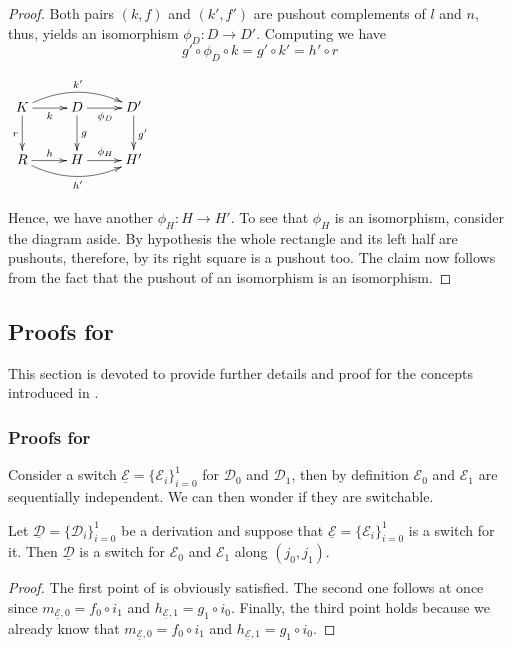 \documentclass[a4paper,UKenglish,cleveref,pdftex,thm-restate,numberwithinsect,anonymous]{lipics}
\newcommand{\dder}[1]{\mathscr{#1}}
\newcommand{\der}[1]{\underline{\dder{#1}}}
\begin{document}
\propUnique*

\label{propUnique-proof}
\begin{proof}
  Both pairs $(k, f)$ and $(k', f')$ are pushout complements of $l$
  and $n$, thus,  yields an isomorphism
  $\phi_D\colon D\to D'$. Computing we have
  \[
    g'\circ \phi_D \circ k= g' \circ k'=h'\circ r
  \]

  \noindent
  \parbox{3cm}{
    $\xymatrix{K \ar@/^.4cm/[rr]^{k'}\ar[d]_{r} \ar[r]_{k}&
      \ar[r]_{\phi_D} D \ar[d]^{g}& D' \ar[d]^{g'}\\ R
      \ar@/_.4cm/[rr]_{h'} \ar[r]^{h}& H \ar[r]^{\phi_H}& H'}$}
  \hfill
  \parbox{10cm}{ \hspace{15pt}Hence, we have another
    $\phi_H\colon H\to H'$. To see that $\phi_H$ is an isomorphism,
    consider the diagram aside. By hypothesis the whole rectangle and
    its left half are pushouts, therefore, by  its right
    square is a pushout too. The claim now follows from the fact that
    the pushout of an isomorphism is an isomorphism. \qedhere }
\end{proof}


\subsection{Proofs for }

This section is devoted to provide further details and proof for the concepts introduced in .

\subsubsection{Proofs for }


Consider a switch $\der{E}=\{\dder{E}_i\}_{i=0}^1$ for $\dder{D}_0$
and $\dder{D}_1$, then by definition $\dder{E}_0$ and $\dder{E}_1$ are
sequentially independent. We can then wonder if they are switchable.

\begin{proposition}
  \label{prop:switch}
  Let $\der{D}=\{\dder{D}_i\}_{i=0}^1$ be a derivation and suppose
  that $\der{E}=\{\dder{E}_i\}_{i=0}^1$ is a switch for it. Then
  $\der{D}$ is a switch for $\dder{E}_0$ and $\dder{E}_1$ along
  $(j_0, j_1)$.
\end{proposition}

\begin{proof}
    The first point of  is obviously satisfied. The
    second one follows at once since $m_{\der{E},0}= f_0\circ i_1$ and $h_{\der{E},1}= g_{1}\circ i_0$.    Finally, the third point holds because we already know that $m_{\der{E},0}= f_0\circ i_1$ and $h_{\der{E},1}= g_{1}\circ i_0$.
\end{proof}
\end{document}

